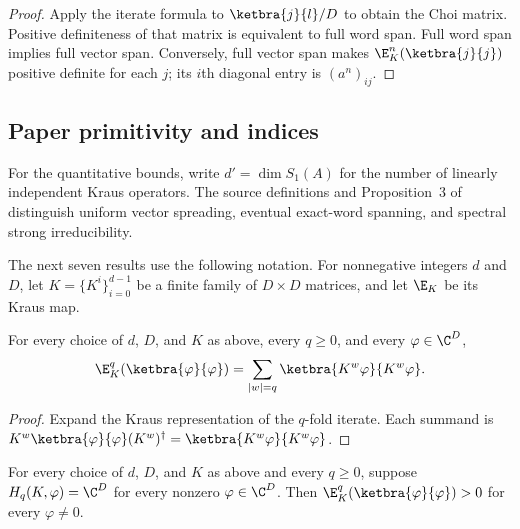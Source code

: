 \begin{proof}\leanok
    Apply the iterate formula to $\ketbra{j}{l}/D$ to obtain the Choi
    matrix. Positive definiteness of that matrix is equivalent to full
    word span. Full word span implies full vector span.
    Conversely, full vector span makes
    $\E_K^n(\ketbra{j}{j})$ positive definite for each $j$; its $i$th
    diagonal entry is $(a^n)_{ij}$.
\end{proof}

\subsection{Paper primitivity and indices}

For the quantitative bounds, write $d'=\dim S_1(A)$ for the number of
linearly independent Kraus operators. The source definitions and
Proposition~3 of~\cite{Sanz2010Quantum} distinguish uniform vector spreading,
eventual exact-word spanning, and spectral strong irreducibility.

The next seven results use the following notation. For nonnegative integers
$d$ and $D$, let $K=\{K^i\}_{i=0}^{d-1}$ be a finite family of $D\times D$
matrices, and let $\E_K$ be its Kraus map.

\begin{theorem}
    \label{thm:kraus_iterate_rank_one_sum}
    \leanok
    For every choice of $d$, $D$, and $K$ as above, every $q\ge0$, and every
    $\varphi\in\C^D$,
    \begin{align}
        \E_K^q(\ketbra{\varphi}{\varphi})
        =\sum_{|w|=q}\ketbra{K^w\varphi}{K^w\varphi}.
        \notag
    \end{align}
\end{theorem}

\begin{proof}\leanok
    Expand the Kraus representation of the $q$-fold iterate. Each summand is
    $K^w\ketbra{\varphi}{\varphi}(K^w)^\dagger
      =\ketbra{K^w\varphi}{K^w\varphi}$.
\end{proof}

\begin{theorem}
    \label{thm:kraus_rank_one_posdef_from_spreading}
    \leanok
    For every choice of $d$, $D$, and $K$ as above and every $q\ge0$, suppose
    $H_q(K,\varphi)=\C^D$ for every nonzero
    $\varphi\in\C^D$. Then
    $\E_K^q(\ketbra{\varphi}{\varphi})>0$ for every
    $\varphi\neq0$.
\end{theorem}

